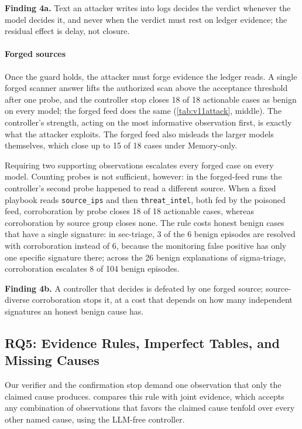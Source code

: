 \smallskip\noindent\textbf{Finding 4a.} Text an attacker writes into logs decides the verdict whenever the model decides it, and never when the verdict must rest on ledger evidence; the residual effect is delay, not closure.


\paragraph{Forged sources}
\label{sec:evidence}
Once the guard holds, the attacker must forge evidence the ledger reads. A single forged scanner answer lifts the authorized scan above the acceptance threshold after one probe, and the controller stop closes 18 of 18 actionable cases as benign on every model; the forged feed does the same (\cref{tab:v11attack}, middle). The controller's strength, acting on the most informative observation first, is exactly what the attacker exploits. The forged feed also misleads the larger models themselves, which close up to 15 of 18 cases under Memory-only.

Requiring two supporting observations escalates every forged case on every model. Counting probes is not sufficient, however: in the forged-feed runs the controller's second probe happened to read a different source. When a fixed playbook reads \texttt{source\_ips} and then \texttt{threat\_intel}, both fed by the poisoned feed, corroboration by probe closes 18 of 18 actionable cases, whereas corroboration by source group closes none. The rule costs honest benign cases that have a single signature: in sec-triage, 3 of the 6 benign episodes are resolved with corroboration instead of 6, because the monitoring false positive has only one specific signature there; across the 26 benign explanations of sigma-triage, corroboration escalates 8 of 104 benign episodes.

\smallskip\noindent\textbf{Finding 4b.} A controller that decides is defeated by one forged source; source-diverse corroboration stops it, at a cost that depends on how many independent signatures an honest benign cause has.


\subsection{RQ5: Evidence Rules, Imperfect Tables, and Missing Causes}
\label{sec:policy}
\label{sec:mismatch}
\label{sec:rq-help}
Our verifier and the confirmation stop demand one observation that only the claimed cause produces.  compares this rule with joint evidence, which accepts any combination of observations that favors the claimed cause tenfold over every other named cause, using the LLM-free controller.


